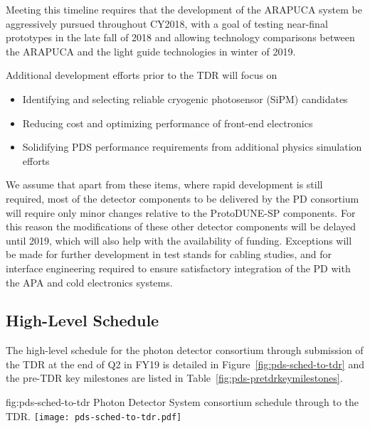 Meeting this timeline requires that the development of the ARAPUCA system be aggressively pursued throughout CY2018, with a goal of testing near-final prototypes in the late fall of \num{2018} and allowing technology comparisons between the ARAPUCA and the light guide technologies in winter of \num{2019}.

Additional development efforts prior to the TDR will focus on

\begin{itemize}
\item Identifying and selecting reliable cryogenic photosensor (SiPM) candidates
\item Reducing cost and optimizing performance of front-end electronics
\item Solidifying PDS performance requirements from additional physics simulation efforts
\end{itemize}

We assume that apart from these items, where rapid development is still required, most of the detector components to be delivered by the PD consortium will require only minor changes relative to the ProtoDUNE-SP components. For this reason the modifications of these other detector components will be delayed until \num{2019}, which will also help with the availability of funding. Exceptions will be made for further development in test stands for cabling studies, and for interface engineering required to ensure satisfactory integration of the PD with the APA and cold electronics systems.


\subsection{High-Level Schedule}
\label{sec:fdsp-pd-org-cs}

The high-level schedule for the photon detector consortium through submission of the TDR at the end of Q2 in FY19 is detailed in Figure~\ref{fig:pds-sched-to-tdr} and the pre-TDR key milestones are listed in Table~\ref{fig:pds-pretdrkeymilestones}.

\begin{dunefigure}{fig:pds-sched-to-tdr}
{Photon Detector System consortium schedule through to the TDR.}
 \texttt{[image: pds-sched-to-tdr.pdf]}
\end{dunefigure}


